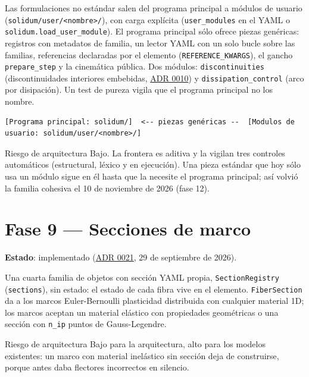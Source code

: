 \documentclass[11pt,oneside]{report}
\begin{document}
Las formulaciones no estándar salen del programa principal a módulos de usuario (\texttt{solidum/\allowbreak{}user/\allowbreak{}\textless{}nombre\textgreater{}/\allowbreak{}}), con carga explícita (\texttt{user\_modules} en el YAML o \texttt{solidum.\allowbreak{}load\_\allowbreak{}user\_\allowbreak{}module}). El programa principal sólo ofrece piezas genéricas: registros con metadatos de familia, un lector YAML con un solo bucle sobre las familias, referencias declaradas por el elemento (\texttt{REFERENCE\_KWARGS}), el gancho \texttt{prepare\_step} y la cinemática pública. Dos módulos: \texttt{discontinuities} (discontinuidades interiores embebidas, \hyperref[adr:0010]{ADR 0010}) y \texttt{dissipation\_\allowbreak{}control} (arco por disipación). Un test de pureza vigila que el programa principal no los nombre.

\begin{lstlisting}
[Programa principal: solidum/]  <-- piezas genéricas --  [Modulos de usuario: solidum/user/<nombre>/]

\end{lstlisting}

\begin{infobox}{Riesgo de arquitectura}
Bajo. La frontera es aditiva y la vigilan tres controles automáticos (estructural, léxico y en ejecución). Una pieza estándar que hoy sólo usa un módulo sigue en él hasta que la necesite el programa principal; así volvió la familia cohesiva el 10 de noviembre de 2026 (fase 12).
\end{infobox}

\section{Fase 9 --- Secciones de marco}

\textbf{Estado}: implementado (\hyperref[adr:0021]{ADR 0021}, 29 de septiembre de 2026).

Una cuarta familia de objetos con sección YAML propia, \texttt{SectionRegistry} (\texttt{sections}), sin estado: el estado de cada fibra vive en el elemento. \texttt{FiberSection} da a los marcos Euler-Bernoulli plasticidad distribuida con cualquier material 1D; los marcos aceptan un material elástico con propiedades geométricas o una sección con \texttt{n\_ip} puntos de Gauss-Legendre.

\begin{infobox}{Riesgo de arquitectura}
Bajo para la arquitectura, alto para los modelos existentes: un marco con material inelástico sin sección deja de construirse, porque antes daba flectores incorrectos en silencio.
\end{infobox}
\end{document}
